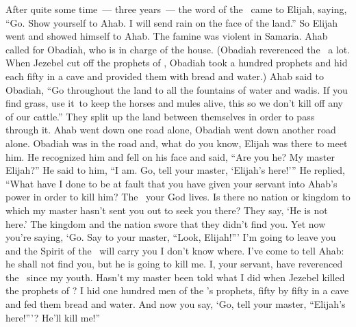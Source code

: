 
\begin{inparaenum}
   After quite some time~--- three years~--- the word of the \lord\ came to Elijah, saying, ``Go. Show yourself to Ahab. I will send rain on the face of the land.''%
   So Elijah went and showed himself to Ahab. The famine was violent in Samaria.%
   Ahab called for Obadiah, who is in charge of the house. (Obadiah reverenced the \lord\ a lot.%
   When Jezebel cut off the prophets of \god, Obadiah took a hundred prophets and hid each fifty in a cave and provided them with bread and water.)%
   Ahab said to Obadiah, ``Go throughout the land to all the fountains of water and wadis. If you find grass, use it\understood\ to keep the horses and mules alive, this so we don't kill off any of our cattle.''%
   They split up the land between themselves in order to pass through it. Ahab went down one road alone, Obadiah went down another road alone.%
   Obadiah was in the road and, what do you know, Elijah was there to meet him. He recognized him and fell on his face and said, ``Are you he? My master Elijah?''%
   He said to him, ``I am. Go, tell your master, `Elijah's here!'\thinspace''%
   He replied, ``What have I done to be at fault that you have given your servant into Ahab's power in order to kill him?%
   The \lord\ your God lives. Is there no nation or kingdom to which my master hasn't sent you out to seek you there? They say, `He is not here.' The kingdom and the nation swore that they didn't find you.%
   Yet now you're saying, `Go. Say to your master, ``Look, Elijah!''\thinspace'%
   I'm going to leave you and the Spirit of the \lord\ will carry you I don't know where. I've come to tell Ahab: he shall not find you, but he is going to kill me. I, your servant, have reverenced the \lord\ since my youth.%
   Hasn't my master been told what I did when Jezebel killed the prophets of \god? I hid one hundred men of the \lord's prophets, fifty by fifty in a cave and fed them bread and water.%
   And now you say, `Go, tell your master, ``Elijah's here!''\thinspace'? He'll kill me!''%
  

\end{inparaenum}
